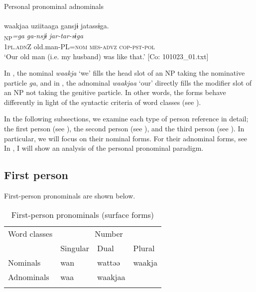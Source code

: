  \ex \label{ex:5:1b} Personal pronominal adnominals\\\\
\glll  waakjaa  uziitaaga  gansjɨ  jatassɨga.\\
[\textit{waakjaa}\textsubscript{Modifier}  \textit{uzii-taa}\textsubscript{Head}]\textsubscript{NP}\textit{=ga}  \textit{ga-nsjɨ}  \textit{jar-tar-sɨga}\\
1\textsc{pl}.\textsc{adn}Z  old.man-PL=\textsc{nom}  \textsc{mes}-\textsc{advz}  \textsc{cop}-\textsc{pst}-\textsc{pol}\\
\glt ‘Our old man (i.e. my husband) was like that.’ [Co: 101023\_01.txt]
\z
\z

In , the nominal \textit{waakja} ‘we’ fills the head slot of an NP taking the nominative particle \textit{ga}, and in , the adnominal \textit{waakjaa} ‘our’ directly fills the modifier slot of an NP not taking the genitive particle. In other words, the forms behave differently in light of the syntactic criteria of word classes (see ).

  In the following subsections, we examine each type of person reference in detail; the first person (see ), the second person (see ), and the third person (see ). In particular, we will focus on their nominal forms. For their adnominal forms, see  In , I will show an analysis of the personal pronominal paradigm.

\subsection{First person}

First-person pronominals are shown below.

\begin{table}
\caption{\label{tab:key:33}First-person pronominals (surface forms)}
\begin{tabular}{llll}
\lsptoprule
Word classes  & \multicolumn{3}{c}{Number}\\\cmidrule(lr){2-4}
              &  Singular & Dual & Plural\\\midrule
Nominals & wan & wattəə & waakja\\
Adnominals & waa & waakjaa\\
\lspbottomrule
\end{tabular}
\end{table}

